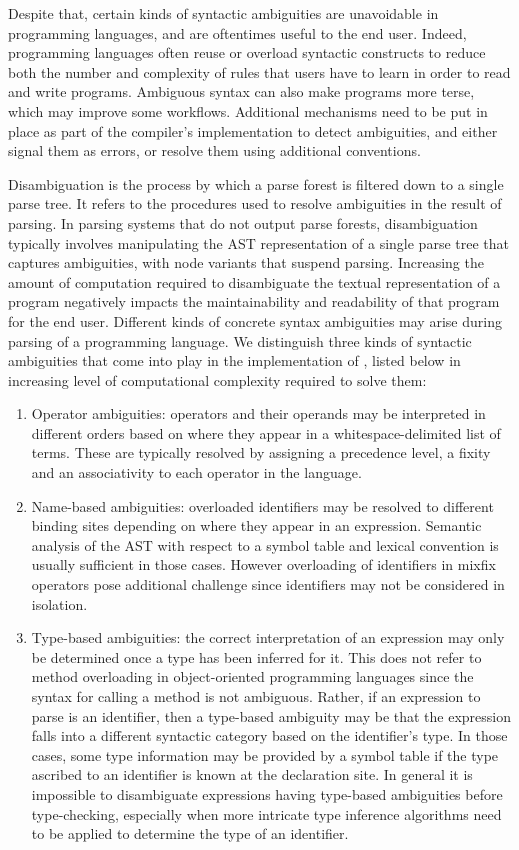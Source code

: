 Despite that, certain kinds of syntactic ambiguities are unavoidable in programming languages, and are oftentimes useful to the end user.
Indeed, programming languages often reuse or overload syntactic constructs to reduce both the number and complexity of rules that users have to learn in order to read and write programs.
Ambiguous syntax can also make programs more terse, which may improve some workflows.
Additional mechanisms need to be put in place as part of the compiler's implementation to detect ambiguities, and either signal them as errors, or resolve them using additional conventions.


Disambiguation is the process by which a parse forest is filtered down to a single parse tree.
It refers to the procedures used to resolve ambiguities in the result of parsing.
In parsing systems that do not output parse forests, disambiguation typically involves manipulating the \ac{AST} representation of a single parse tree that captures ambiguities, with node variants that suspend parsing.
Increasing the amount of computation required to disambiguate the textual representation of a program negatively impacts the maintainability and readability of that program for the end user.
Different kinds of concrete syntax ambiguities may arise during parsing of a programming language.
We distinguish three kinds of syntactic ambiguities that come into play in the implementation of \Beluga, listed below in increasing level of computational complexity required to solve them:
\begin{enumerate}
\item
Operator ambiguities: operators and their operands may be interpreted in different orders based on where they appear in a whitespace-delimited list of terms.
These are typically resolved by assigning a precedence level, a fixity and an associativity to each operator in the language.
\item
Name-based ambiguities: overloaded identifiers may be resolved to different binding sites depending on where they appear in an expression.
Semantic analysis of the \ac{AST} with respect to a symbol table and lexical convention is usually sufficient in those cases.
However overloading of identifiers in mixfix operators pose additional challenge since identifiers may not be considered in isolation.
\item
Type-based ambiguities: the correct interpretation of an expression may only be determined once a type has been inferred for it.
This does not refer to method overloading in object-oriented programming languages since the syntax for calling a method is not ambiguous.
Rather, if an expression to parse is an identifier, then a type-based ambiguity may be that the expression falls into a different syntactic category based on the identifier's type.
In those cases, some type information may be provided by a symbol table if the type ascribed to an identifier is known at the declaration site.
In general it is impossible to disambiguate expressions having type-based ambiguities before type-checking, especially when more intricate type inference algorithms need to be applied to determine the type of an identifier.
\end{enumerate}

